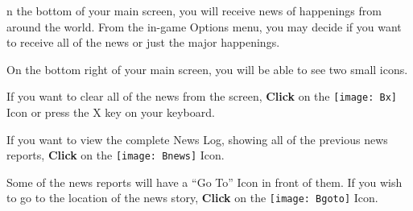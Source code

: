 
n the bottom of your main screen, you will receive news of happenings from around the world. From the in-game Options menu, you may decide if you want to receive all of the news or just the major happenings.

On the bottom right of your main screen, you will be able to see two small icons.

If you want to clear all of the news from the screen, \textbf{Click} on the \texttt{[image: Bx]} Icon or press the X key on your keyboard.

If you want to view the complete News Log, showing all of the previous news reports, \textbf{Click} on the \texttt{[image: Bnews]} Icon.

Some of the news reports will have a “Go To” Icon in front of them. If you wish to go to the location of the news story, \textbf{Click} on the \texttt{[image: Bgoto]} Icon.